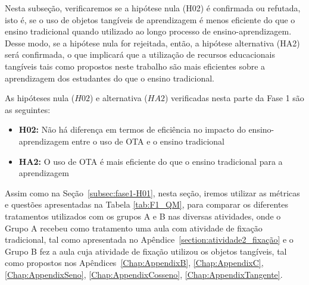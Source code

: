 Nesta subseção, verificaremos se a hipótese nula (H02) é confirmada ou refutada, isto é, se o uso de objetos tangíveis de aprendizagem é menos eficiente do que o ensino tradicional quando utilizado ao longo processo de ensino-aprendizagem. Desse modo, se a hipótese nula for rejeitada, então, a hipótese alternativa (HA2) será confirmada, o que implicará que a utilização de recursos educacionais tangíveis tais como propostos neste trabalho são mais eficientes sobre a aprendizagem dos estudantes do que o ensino tradicional. 


As hipóteses nula ($H02$) e alternativa ($HA2$) verificadas nesta parte da Fase 1 são as seguintes:
\begin{itemize}
	\item \textbf{H02:}  Não há diferença em termos de eficiência no impacto do ensino-aprendizagem entre o uso de OTA e o ensino tradicional
	\item \textbf{HA2:} O uso de OTA é mais eficiente do que o ensino tradicional para a aprendizagem
\end{itemize}

Assim como na Seção~\ref{subsec:fase1-H01}, nesta seção, iremos utilizar as métricas e questões apresentadas na Tabela \ref{tab:F1_QM}, para comparar os diferentes tratamentos utilizados com os grupos A e B nas diversas atividades, onde o Grupo A recebeu como tratamento uma aula com atividade de fixação tradicional, tal como apresentada no Apêndice~\ref{section:atividade2_fixação} e o  Grupo B fez a aula cuja atividade de fixação utilizou os objetos tangíveis, tal como propostos nos Apêndices~\ref{Chap:AppendixB}, \ref{Chap:AppendixC}, \ref{Chap:AppendixSeno}, \ref{Chap:AppendixCosseno}, \ref{Chap:AppendixTangente}.


